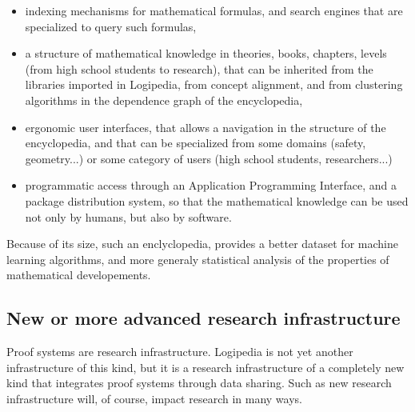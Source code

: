 \begin{itemize}
\item indexing mechanisms for mathematical formulas, and search engines
  that are specialized to query such formulas,

  \item a structure of mathematical knowledge in theories, books,
    chapters, levels (from high school students to research), that can
    be inherited from the libraries imported in {\sf Logipedia}, from
    concept alignment, and from clustering algorithms in the dependence
    graph of the encyclopedia, 

  \item ergonomic user interfaces, that allows a navigation in the
    structure of the encyclopedia, and that can be specialized from
    some domains (safety, geometry...) or some category of users
    (high school students, researchers...)

  \item programmatic access through an Application Programming
    Interface, and a package distribution system, so that the
    mathematical knowledge can be used not only by humans, but also by
    software.
\end{itemize}

Because of its size, such an enclyclopedia, provides a better dataset
for machine learning algorithms, and more generaly statistical
analysis of the properties of mathematical developements.

\subsection{New or more advanced research infrastructure}

Proof systems are research infrastructure. {\sf Logipedia} is not yet
another infrastructure of this kind, but it is a research
infrastructure of a completely new kind that integrates proof systems
through data sharing.  Such as new research infrastructure will, of
course, impact research in many ways.

